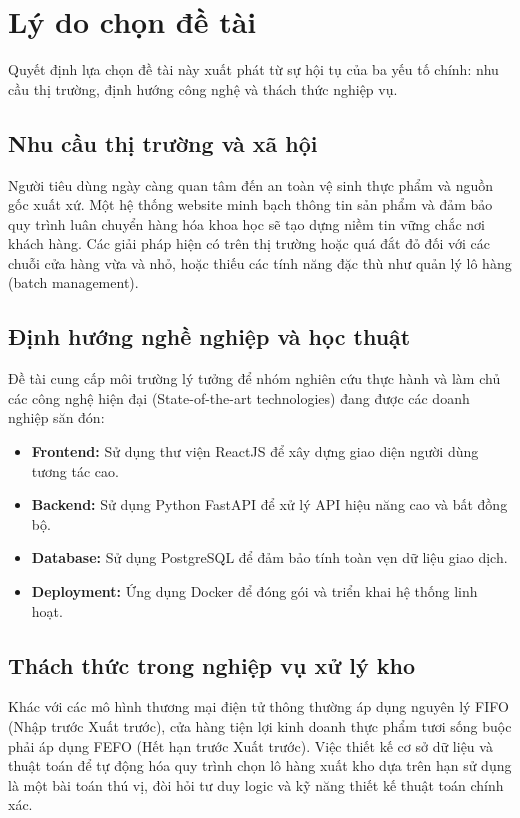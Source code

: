 \section{Lý do chọn đề tài}

Quyết định lựa chọn đề tài này xuất phát từ sự hội tụ của ba yếu tố chính: nhu cầu thị trường, định hướng công nghệ và thách thức nghiệp vụ.

\subsection{Nhu cầu thị trường và xã hội}
Người tiêu dùng ngày càng quan tâm đến an toàn vệ sinh thực phẩm và nguồn gốc xuất xứ. Một hệ thống website minh bạch thông tin sản phẩm và đảm bảo quy trình luân chuyển hàng hóa khoa học sẽ tạo dựng niềm tin vững chắc nơi khách hàng. Các giải pháp hiện có trên thị trường hoặc quá đắt đỏ đối với các chuỗi cửa hàng vừa và nhỏ, hoặc thiếu các tính năng đặc thù như quản lý lô hàng (batch management).

\subsection{Định hướng nghề nghiệp và học thuật}
Đề tài cung cấp môi trường lý tưởng để nhóm nghiên cứu thực hành và làm chủ các công nghệ hiện đại (State-of-the-art technologies) đang được các doanh nghiệp săn đón:
\begin{itemize}
    \item \textbf{Frontend:} Sử dụng thư viện ReactJS để xây dựng giao diện người dùng tương tác cao.
    \item \textbf{Backend:} Sử dụng Python FastAPI để xử lý API hiệu năng cao và bất đồng bộ.
    \item \textbf{Database:} Sử dụng PostgreSQL để đảm bảo tính toàn vẹn dữ liệu giao dịch.
    \item \textbf{Deployment:} Ứng dụng Docker để đóng gói và triển khai hệ thống linh hoạt.
\end{itemize}

\subsection{Thách thức trong nghiệp vụ xử lý kho}
Khác với các mô hình thương mại điện tử thông thường áp dụng nguyên lý FIFO (Nhập trước Xuất trước), cửa hàng tiện lợi kinh doanh thực phẩm tươi sống buộc phải áp dụng FEFO (Hết hạn trước Xuất trước). Việc thiết kế cơ sở dữ liệu và thuật toán để tự động hóa quy trình chọn lô hàng xuất kho dựa trên hạn sử dụng là một bài toán thú vị, đòi hỏi tư duy logic và kỹ năng thiết kế thuật toán chính xác.

